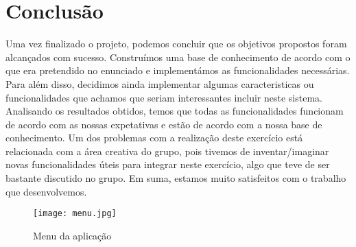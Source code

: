 \chapter{Conclusão}

Uma vez finalizado o projeto, podemos concluir que os objetivos propostos foram alcançados com sucesso. Construímos uma base de conhecimento de acordo com o que era pretendido no enunciado e implementámos as funcionalidades necessárias. Para além disso, decidimos ainda implementar algumas caracteristicas ou funcionalidades que achamos que seriam interessantes incluir neste sistema. Analisando os resultados obtidos, temos que todas as funcionalidades funcionam de acordo com as nossas expetativas e estão de acordo com a nossa base de conhecimento. Um dos problemas com a realização deste exercício está relacionada com a área creativa do grupo, pois tivemos de inventar/imaginar novas funcionalidades úteis para integrar neste exercício, algo que teve de ser bastante discutido no grupo. Em suma, estamos muito satisfeitos com o trabalho que desenvolvemos. 

\begin{figure}[<+h+>]
	\centering
	\texttt{[image: menu.jpg]}
	\caption{Menu da aplicação}
\end{figure}
